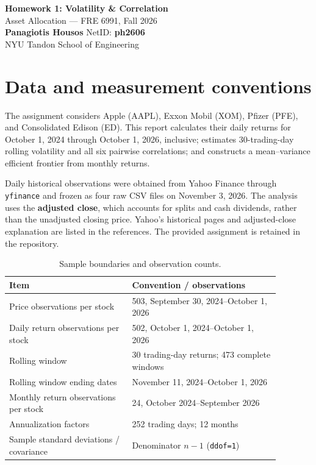 \documentclass[10pt,letterpaper]{article}
\begin{document}
\begin{center}
{\Large\bfseries\color{navy} Homework 1: Volatility \& Correlation}\\[5pt]
{\large Asset Allocation --- FRE 6991, Fall 2026}\\[6pt]
\textbf{Panagiotis Housos} \quad NetID: \textbf{ph2606}\\
NYU Tandon School of Engineering
\end{center}
\vspace{-3pt}

\section{Data and measurement conventions}
The assignment considers Apple (AAPL), Exxon Mobil (XOM), Pfizer (PFE), and
Consolidated Edison (ED). This report calculates their daily returns for
October 1, 2024 through October 1, 2026, inclusive; estimates 30-trading-day
rolling volatility and all six pairwise correlations; and constructs a
mean--variance efficient frontier from monthly returns.

Daily historical observations were obtained from Yahoo Finance through
\texttt{yfinance} and frozen as four raw CSV files on November 3, 2026.
The analysis uses the \textbf{adjusted close}, which accounts for splits and
cash dividends, rather than the unadjusted closing price. Yahoo's historical
pages and adjusted-close explanation are listed in the references. The
provided assignment is retained in the repository.

\begin{table}[H]
\centering
\caption{Sample boundaries and observation counts.}
\label{tab:sample}
\small
\begin{tabular}{p{0.40\linewidth}p{0.48\linewidth}}
\toprule
Item & Convention / observations \\
\midrule
Price observations per stock & 503, September 30, 2024--October 1, 2026 \\
Daily return observations per stock & 502, October 1, 2024--October 1, 2026 \\
Rolling window & 30 trading-day returns; 473 complete windows \\
Rolling window ending dates & November 11, 2024--October 1, 2026 \\
Monthly return observations per stock & 24, October 2024--September 2026 \\
Annualization factors & 252 trading days; 12 months \\
Sample standard deviations / covariance & Denominator $n-1$ (\texttt{ddof=1}) \\
\bottomrule
\end{tabular}
\end{table}
\end{document}
